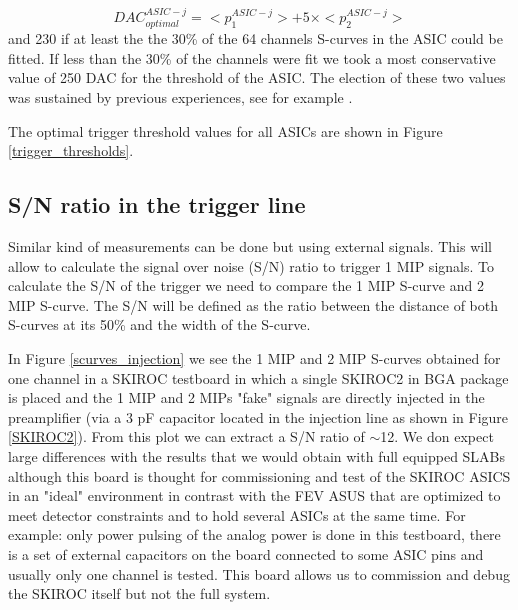 \documentclass[a4paper,11pt]{article}
\begin{document}
\begin{equation}
DAC_{optimal}^{ASIC-j} = <p_{1}^{ASIC-j}> + 5 \times <p_{2}^{ASIC-j}>
\end{equation}
and 230 if at least the the 30\% of the 64 channels S-curves in the ASIC could be fitted. 
If less than the 30\% of the channels were fit
we took a most conservative value of 250 DAC for the threshold of the ASIC.
The election of these two values was 
sustained by previous experiences, see for example \cite{Amjad:2014tha}.

The optimal trigger threshold values for all ASICs are shown in Figure \ref{trigger_thresholds}.


\subsection{S/N ratio in the trigger line}
\label{sec:comm_trigger_sn}

Similar kind of measurements can be done but using external signals. 
This will allow to calculate the signal over noise (S/N) ratio to trigger 1 MIP signals.
To calculate the S/N of the trigger we need to compare the 1 MIP S-curve and 2 MIP S-curve. The S/N 
will be defined as the ratio between the distance of both S-curves at its 50\% and the width of the 
S-curve.

In Figure \ref{scurves_injection} we see the 1 MIP and 2 MIP S-curves obtained for one channel
in a SKIROC testboard in which a single SKIROC2 in BGA package is placed and the 1 MIP and 2 MIPs 
"fake" signals are directly injected in the preamplifier (via a 3 pF capacitor located in the injection line as shown in Figure \ref{SKIROC2}). 
From this plot we can extract a S/N ratio of $\sim$12. 
We don expect large differences with the results that we would obtain with 
full equipped SLABs 
although this board is thought for commissioning and test of the SKIROC ASICS in an
"ideal" environment in contrast with the FEV
ASUS that are optimized to meet detector constraints and to hold several ASICs at the same time.
For example: only power pulsing of the analog power is done in this testboard,
there is a set of external capacitors on the board connected to some ASIC pins and
usually only one channel is tested. This board allows us to commission and debug the SKIROC itself
but not the full system.
\end{document}
